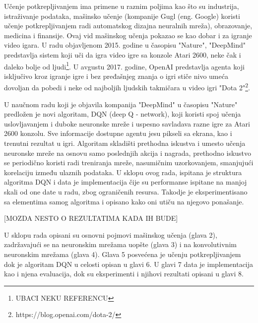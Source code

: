 Učenje potkrepljivanjem ima primene u raznim poljima kao što su industrija, istraživanje podataka, mašinsko učenje (kompanije Gugl (eng. Google) koristi učenje potkrepljivanjem radi automatskog dizajna neuralnih mreža), obrazovanje, medicina i finansije. Ovaj vid mašinskog učenja pokazao se kao dobar i za igranje video igara.  U radu objavljenom 2015. godine u časopisu "Nature", "DeepMind" predstavlja sistem koji uči da igra video igre sa konzole Atari 2600, neke čak i daleko bolje od ljudi\footnote{UBACI NEKU REFERENCU}. U avgustu 2017. godine, OpenAI predstavlja agenta koji isključivo kroz igranje igre i bez pređašnjeg znanja o igri stiče nivo umeća dovoljan da pobedi i neke od najboljih ljudskih takmičara u video igri "Dota 2"\footnote{https://blog.openai.com/dota-2/}. 

U naučnom radu koji je objavila kompanija "DeepMind" u časopisu "Nature" predložen je novi algoritam, DQN (deep Q - network), koji koristi spoj učenja uslovljavanjem i duboke neuronske mreže i uspesno savladava razne igre za Atari 2600 konzolu. Sve informacije dostupne agentu jesu pikseli sa ekrana, kao i trenutni rezultat u igri. Algoritam skladišti prethodna iskustva i umesto učenja neuronske mreže na osnovu samo poslednjih akcija i nagrada, prethodno iskustvo se periodično koristi radi treniranja mreže, nasumičnim uzorkovanjem, smanjujući korelaciju između ulaznih podataka. 
U sklopu ovog rada, ispitana je struktura algoritma DQN i data je implementacija čije su performanse ispitane na manjoj skali od one date u radu, zbog ograničenih resursa. Takodje je eksperimentisano sa elementima samog algoritma i opisano kako oni utiču na njegovo ponašanje.


[MOZDA NESTO O REZULTATIMA KADA IH BUDE]


U sklopu rada opisani su osnovni pojmovi mašinskog učenja (glava 2), zadržavajući se na neuronskim mrežama uopšte (glava 3) i na konvolutivnim neuronskim mrežama (glava 4). Glava 5 posvećena je učenju potkrepljivanjem dok je algoritam DQN u celosti opisan u glavi 6. U glavi 7 data je implementacija kao i njena evaluacija, dok su eksperimenti i njihovi rezultati opisani u glavi 8. 